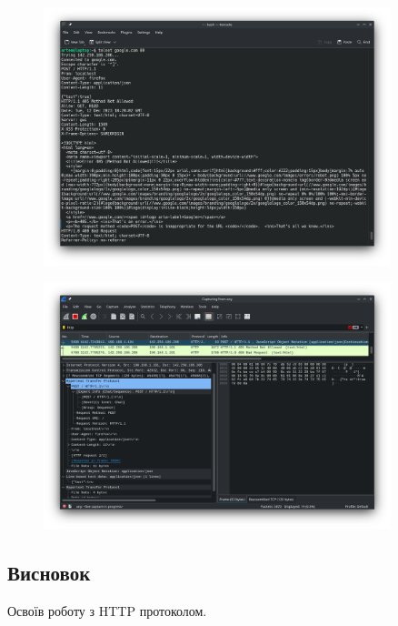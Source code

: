 \documentclass[12pt]{extarticle}
\begin{document}
\begin{figure}[H]
    \centering
    \includegraphics[width=0.90\textwidth]{post}
    \caption{}
\end{figure}
\begin{figure}[H]
    \centering
    \includegraphics[width=0.90\textwidth]{shark_post}
    \caption{}
\end{figure}



\subsection*{Висновок} 
Освоїв роботу з HTTP протоколом. 
\end{document}
